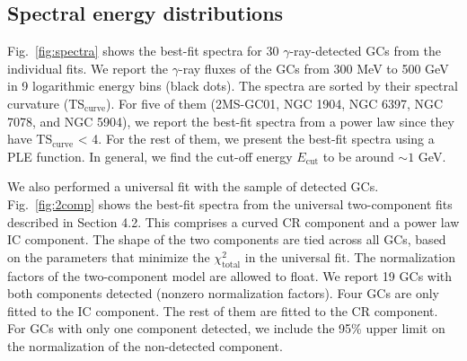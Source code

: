 \documentclass[doublespace,nopageskip]{VTthesis} %
\begin{document}
\begin{appendices}
\clearpage

\section{Spectral energy distributions}\label{appx:spectra}

Fig.~\ref{fig:spectra} shows the best-fit spectra for 30 $\gamma$-ray-detected GCs from the individual fits. We report the $\gamma$-ray fluxes of the GCs from 300 MeV to 500 GeV in 9 logarithmic energy bins (black dots). The spectra are sorted by their spectral curvature (TS$_\mathrm{curve}$). For five of them (2MS-GC01, NGC 1904, NGC 6397, NGC 7078, and NGC 5904), we report the best-fit spectra from a power law since they have TS$_\mathrm{curve}$ < 4. For the rest of them, we present the best-fit spectra using a PLE function. In general, we find the cut-off energy $E_\mathrm{cut}$ to be around $\sim 1$ GeV.

We also performed a universal fit with the sample of detected GCs. Fig.~\ref{fig:2comp} shows the best-fit spectra from the universal two-component fits described in Section 4.2. This comprises a curved CR component and a power law IC component. The shape of the two components are tied across all GCs, based on the parameters that minimize the $\chi^2_\mathrm{total}$ in the universal fit. The normalization factors of the two-component model are allowed to float. We report 19 GCs with both components detected (nonzero normalization factors). Four GCs are only fitted to the IC component. The rest of them are fitted to the CR component. For GCs with only one component detected, we include the 95\% upper limit on the normalization of the non-detected component.


\end{appendices}
\end{document}
